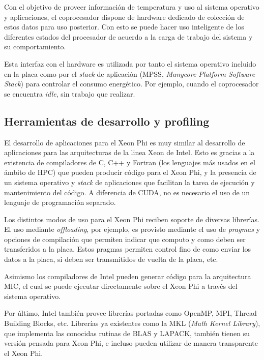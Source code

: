 Con el objetivo de proveer informaci\'on de temperatura y uso al sistema operativo y aplicaciones, el coprocesador dispone de
hardware dedicado de colecci\'on de estos datos para uso posterior. Con esto se puede hacer uso inteligente de los diferentes
estados del procesador de acuerdo a la carga de trabajo del sistema y su comportamiento.

Esta interfaz con el hardware es utilizada por tanto el sistema operativo incluido en la placa como por el \textit{stack} de
aplicaci\'on (MPSS, \textit{Manycore Platform Software Stack}) para controlar el consumo energ\'etico. Por ejemplo, cuando el
coprocesador se encuentra \textit{idle}, sin trabajo que realizar.

\subsection{Herramientas de desarrollo y profiling}

El desarrollo de aplicaciones para el Xeon Phi es muy similar al desarrollo de aplicaciones para las arquitecturas
de la linea Xeon de Intel. Esto es gracias a la existencia de compiladores de C, C++ y Fortran (los lenguajes m\'as usados en
el \'ambito de HPC) que pueden producir c\'odigo para el Xeon Phi, y la presencia de un sistema operativo y \textit{stack}
de aplicaciones que facilitan la tarea de ejecuci\'on y mantenimiento del c\'odigo. A diferencia de \nvidia{} CUDA, no es necesario
el uso de un lenguaje de programaci\'on separado.

Los distintos modos de uso para el Xeon Phi reciben soporte de diversas librer\'ias. El uso mediante \textit{offloading}, por ejemplo,
es provisto mediante el uso de \textit{pragmas} y opciones de compilaci\'on que permiten indicar que computo y como deben ser transferidos
a la placa. Estos pragmas permiten control fino de como enviar los datos a la placa, si deben ser transmitidos de vuelta de la placa,
etc.

Asimismo los compiladores de Intel pueden generar c\'odigo para la arquitectura MIC, el cual se puede ejecutar directamente sobre
el Xeon Phi a trav\'es del sistema operativo.

Por \'ultimo, Intel tambi\'en provee librer\'ias portadas como OpenMP, MPI, Thread Building Blocks, etc. Librer\'ias ya existentes
como la MKL (\textit{Math Kernel Library}), que implementa las conocidas rutinas de BLAS y LAPACK, tambi\'en tienen su versi\'on
pensada para Xeon Phi, e incluso pueden utilizar de manera transparente el Xeon Phi.

